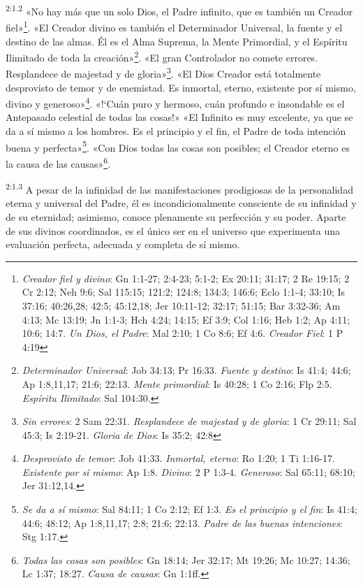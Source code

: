 \par
\textsuperscript{2:1.2} «No hay más que un solo Dios, el Padre infinito, que es también un Creador fiel»\footnote{\textit{Creador fiel y divino}: Gn 1:1-27; 2:4-23; 5:1-2; Ex 20:11; 31:17; 2 Re 19:15; 2 Cr 2:12; Neh 9:6; Sal 115:15; 121:2; 124:8; 134:3; 146:6; Eclo 1:1-4; 33:10; Is 37:16; 40:26,28; 42:5; 45:12,18; Jer 10:11-12; 32:17; 51:15; Bar 3:32-36; Am 4:13; Mc 13:19; Jn 1:1-3; Hch 4:24; 14:15; Ef 3:9; Col 1:16; Heb 1:2; Ap 4:11; 10:6; 14:7. \textit{Un Dios, el Padre}: Mal 2:10; 1 Co 8:6; Ef 4:6. \textit{Creador Fiel}: 1 P 4:19}. «El Creador divino es también el Determinador Universal, la fuente y el destino de las almas. Él es el Alma Suprema, la Mente Primordial, y el Espíritu Ilimitado de toda la creación»\footnote{\textit{Determinador Universal}: Job 34:13; Pr 16:33. \textit{Fuente y destino}: Is 41:4; 44:6; Ap 1:8,11,17; 21:6; 22:13. \textit{Mente primordial}: Is 40:28; 1 Co 2:16; Flp 2:5. \textit{Espíritu Ilimitado}: Sal 104:30.}. «El gran Controlador no comete errores. Resplandece de majestad y de gloria»\footnote{\textit{Sin errores}: 2 Sam 22:31. \textit{Resplandece de majestad y de gloria}: 1 Cr 29:11; Sal 45:3; Is 2:19-21. \textit{Gloria de Dios}: Is 35:2; 42:8}. «El Dios Creador está totalmente desprovisto de temor y de enemistad. Es inmortal, eterno, existente por sí mismo, divino y generoso»\footnote{\textit{Desprovisto de temor}: Job 41:33. \textit{Inmortal, eterno}: Ro 1:20; 1 Ti 1:16-17. \textit{Existente por sí mismo}: Ap 1:8. \textit{Divino}: 2 P 1:3-4. \textit{Generoso}: Sal 65:11; 68:10; Jer 31:12,14.}. «!`Cuán puro y hermoso, cuán profundo e insondable es el Antepasado celestial de todas las cosas!» «El Infinito es muy excelente, ya que se da a sí mismo a los hombres. Es el principio y el fin, el Padre de toda intención buena y perfecta»\footnote{\textit{Se da a sí mismo}: Sal 84:11; 1 Co 2:12; Ef 1:3. \textit{Es el principio y el fin}: Is 41:4; 44:6; 48:12; Ap 1:8,11,17; 2:8; 21:6; 22:13. \textit{Padre de las buenas intenciones}: Stg 1:17.}. «Con Dios todas las cosas son posibles; el Creador eterno es la causa de las causas»\footnote{\textit{Todas las cosas son posibles}: Gn 18:14; Jer 32:17; Mt 19:26; Mc 10:27; 14:36; Lc 1:37; 18:27. \textit{Causa de causas}: Gn 1:1ff.}.

\par
\textsuperscript{2:1.3} A pesar de la infinidad de las manifestaciones prodigiosas de la personalidad eterna y universal del Padre, él es incondicionalmente consciente de su infinidad y de su eternidad; asimismo, conoce plenamente su perfección y su poder. Aparte de sus divinos coordinados, es el único ser en el universo que experimenta una evaluación perfecta, adecuada y completa de sí mismo.

